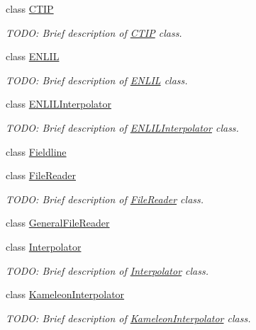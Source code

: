 \begin{DoxyCompactItemize}
\item 
class \hyperlink{classccmc_1_1_c_t_i_p}{C\-T\-I\-P}
\begin{DoxyCompactList}\small\item\em T\-O\-D\-O\-: Brief description of \hyperlink{classccmc_1_1_c_t_i_p}{C\-T\-I\-P} class. \end{DoxyCompactList}\item 
class \hyperlink{classccmc_1_1_e_n_l_i_l}{E\-N\-L\-I\-L}
\begin{DoxyCompactList}\small\item\em T\-O\-D\-O\-: Brief description of \hyperlink{classccmc_1_1_e_n_l_i_l}{E\-N\-L\-I\-L} class. \end{DoxyCompactList}\item 
class \hyperlink{classccmc_1_1_e_n_l_i_l_interpolator}{E\-N\-L\-I\-L\-Interpolator}
\begin{DoxyCompactList}\small\item\em T\-O\-D\-O\-: Brief description of \hyperlink{classccmc_1_1_e_n_l_i_l_interpolator}{E\-N\-L\-I\-L\-Interpolator} class. \end{DoxyCompactList}\item 
class \hyperlink{classccmc_1_1_fieldline}{Fieldline}
\item 
class \hyperlink{classccmc_1_1_file_reader}{File\-Reader}
\begin{DoxyCompactList}\small\item\em T\-O\-D\-O\-: Brief description of \hyperlink{classccmc_1_1_file_reader}{File\-Reader} class. \end{DoxyCompactList}\item 
class \hyperlink{classccmc_1_1_general_file_reader}{General\-File\-Reader}
\item 
class \hyperlink{classccmc_1_1_interpolator}{Interpolator}
\begin{DoxyCompactList}\small\item\em T\-O\-D\-O\-: Brief description of \hyperlink{classccmc_1_1_interpolator}{Interpolator} class. \end{DoxyCompactList}\item 
class \hyperlink{classccmc_1_1_kameleon_interpolator}{Kameleon\-Interpolator}
\begin{DoxyCompactList}\small\item\em T\-O\-D\-O\-: Brief description of \hyperlink{classccmc_1_1_kameleon_interpolator}{Kameleon\-Interpolator} class. \end{DoxyCompactList}\item 

\end{DoxyCompactItemize}
